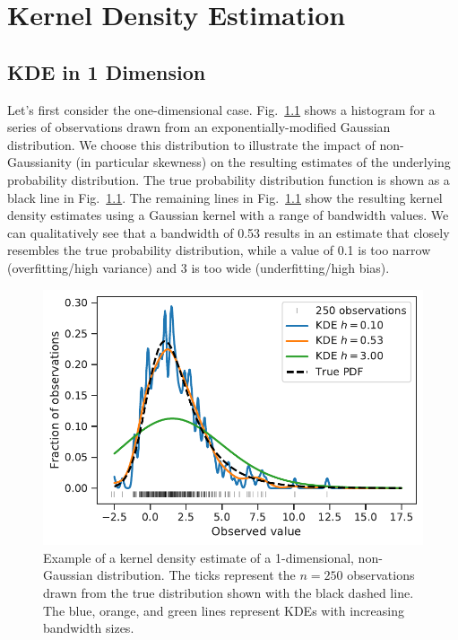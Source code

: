 \chapter{Kernel Density Estimation}
\section{KDE in 1 Dimension}
\label{sec:1d}
Let's first consider the one-dimensional case. Fig.~\ref{fig:1d_hist} shows a histogram for a series of observations drawn from an exponentially-modified Gaussian distribution. We choose this distribution to illustrate the impact of non-Gaussianity (in particular skewness) on the resulting estimates of the underlying probability distribution. The true probability distribution function is shown as a black line in Fig.~\ref{fig:1d_hist}. The remaining lines in Fig.~\ref{fig:1d_hist} show the resulting kernel density estimates using a Gaussian kernel with a range of bandwidth values. We can qualitatively see that a bandwidth of 0.53 results in an estimate that closely resembles the true probability distribution, while a value of 0.1 is too narrow (overfitting/high variance) and 3 is too wide (underfitting/high bias).

\begin{figure}
    \centering
    \includegraphics{figures/snemo_kde/1d_hist_example.pdf}
    \caption{Example of a kernel density estimate of a 1-dimensional, non-Gaussian distribution. The ticks represent the $n=250$ observations drawn from the true distribution shown with the black dashed line. The blue, orange, and green lines represent KDEs with increasing bandwidth sizes.}
    \label{fig:1d_hist}
\end{figure}

